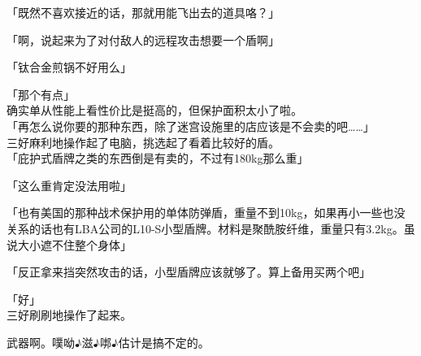 「既然不喜欢接近的话，那就用能飞出去的道具咯？」

「啊，说起来为了对付敌人的远程攻击想要一个盾啊」

「钛合金煎锅不好用么」

「那个有点」\\

确实单从性能上看性价比是挺高的，但保护面积太小了啦。\\

「再怎么说你要的那种东西，除了迷宫设施里的店应该是不会卖的吧……」\\

三好麻利地操作起了电脑，挑选起了看着比较好的盾。\\

「庇护式盾牌之类的东西倒是有卖的，不过有180kg那么重」

「这么重肯定没法用啦」

「也有美国的那种战术保护用的单体防弹盾，重量不到10kg，如果再小一些也没关系的话也有LBA公司的L10-S小型盾牌。材料是聚酰胺纤维，重量只有3.2kg。虽说大小遮不住整个身体」

「反正拿来挡突然攻击的话，小型盾牌应该就够了。算上备用买两个吧」

「好」\\

三好刷刷地操作了起来。

武器啊。噗呦♪滋♪𠳐♪估计是搞不定的。\\

